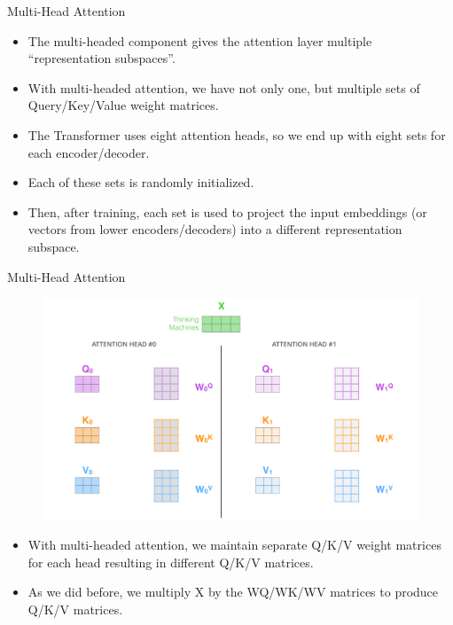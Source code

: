 \documentclass[handout]{beamer}
\begin{document}
\begin{frame}{Multi-Head Attention}
\begin{scriptsize}


\begin{itemize}


\item The multi-headed component gives the attention layer multiple ``representation subspaces''.
\item With multi-headed attention, we have not only one, but multiple sets of Query/Key/Value weight matrices.
\item The Transformer uses eight attention heads, so we end up with eight sets for each encoder/decoder.
\item Each of these sets is randomly initialized.
\item Then, after training, each set is used to project the input embeddings (or vectors from lower encoders/decoders) into a different representation subspace.
 
\end{itemize}

\end{scriptsize}

\end{frame}



\begin{frame}{Multi-Head Attention}

     \begin{figure}[h]
        	\includegraphics[scale = 0.2]{pics/transformer_attention_heads_qkv.png}
        \end{figure}


\begin{scriptsize}
\begin{itemize}
 \item With multi-headed attention, we maintain separate Q/K/V weight matrices for each head resulting in different Q/K/V matrices.
 \item As we did before, we multiply X by the WQ/WK/WV matrices to produce Q/K/V matrices.



\end{itemize}

\end{scriptsize}

\end{frame}
\end{document}
